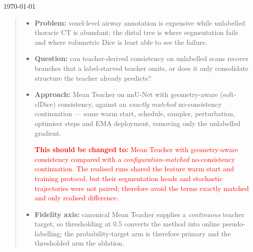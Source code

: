 \documentclass[
11pt, %
oneside, %
english, %
singlespacing, %
parskip, %
headsepline, %
]{MastersDoctoralThesis} %
\begin{document}
\begin{titlepage}
\begin{center}
\vfill

{\large \today}\\[4cm] %

\end{center}
\end{titlepage}


\begin{abstract}
\addchaptertocentry{\abstractname} %
\begin{itemize}
  \item \textbf{Problem:} voxel-level airway annotation is expensive while unlabelled
  thoracic CT is abundant; the distal tree is where segmentation fails and where volumetric
  Dice is least able to see the failure.
  \item \textbf{Question:} can teacher-derived consistency on unlabelled scans recover
  branches that a label-starved teacher omits, or does it only consolidate structure the
  teacher already predicts?
  \item \textbf{Approach:} Mean Teacher on nnU-Net with geometry-aware (soft-clDice)
  consistency, against an \emph{exactly matched} no-consistency continuation --- same warm
  start, schedule, sampler, perturbation, optimiser steps and EMA deployment, removing only
  the unlabelled gradient.
  \par\textcolor{red}{\textbf{This should be changed to:} Mean Teacher with geometry-aware
  consistency compared with a \emph{configuration-matched} no-consistency continuation. The
  realised runs shared the feature warm start and training protocol, but their segmentation
  heads and stochastic trajectories were not paired; therefore avoid the terms exactly matched
  and only realised difference.}
  \item \textbf{Fidelity axis:} canonical Mean Teacher supplies a \emph{continuous} teacher
  target, so thresholding at 0.5 converts the method into online pseudo-labelling; the
  probability-target arm is therefore primary and the thresholded arm the ablation.

\end{itemize}
\end{abstract}
\end{document}

